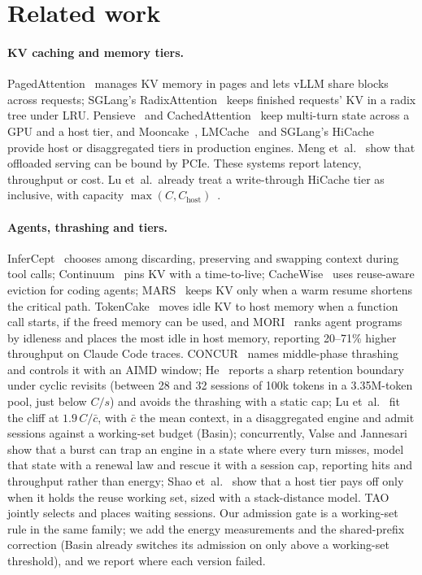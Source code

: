 \section{Related work}
\label{sec:related}

\paragraph{KV caching and memory tiers.} PagedAttention~\cite{kwon2023pagedattention} manages KV memory in pages and
lets vLLM share blocks across requests; SGLang's RadixAttention~\cite{zheng2024sglang} keeps finished requests' KV in a
radix tree under LRU\@. Pensieve~\cite{yu2025pensieve} and CachedAttention~\cite{gao2024cachedattention} keep
multi-turn state across a GPU and a host tier, and Mooncake~\cite{qin2024mooncake}, LMCache~\cite{liu2025lmcache} and
SGLang's HiCache~\cite{xie2025hicache} provide host or disaggregated tiers in production engines. Meng
et~al.~\cite{meng2025bottlenecks} show that offloaded serving can be bound by PCIe. These systems report latency,
throughput or cost. Lu et~al.\ already treat a write-through HiCache tier as inclusive, with capacity
$\max(C, C_{\text{host}})$~\cite{lu2026metastability}.

\paragraph{Agents, thrashing and tiers.} InferCept~\cite{abhyankar2024infercept} chooses among discarding, preserving
and swapping context during tool calls; Continuum~\cite{li2025continuum} pins KV with a time-to-live; CacheWise~\cite{tiwari2026cachewise}
uses reuse-aware eviction for coding agents; MARS~\cite{wang2026mars} keeps KV only when a warm resume shortens the
critical path. TokenCake~\cite{tokencake2025} moves idle KV to host memory when a function call starts, if the freed memory can be used, and
MORI~\cite{xia2026mori} ranks agent programs by idleness and places the most idle in host memory, reporting 20--71\%
higher throughput on Claude Code traces. CONCUR~\cite{chen2026concur} names middle-phase thrashing and controls it with
an AIMD window; He~\cite{he2026robot} reports a sharp retention boundary under cyclic revisits (between 28 and 32 sessions of 100k tokens in a 3.35M-token pool,
just below $C/s$) and avoids the thrashing with a static cap; Lu et~al.~\cite{lu2026metastability} fit the cliff at $1.9\,C/\bar c$, with $\bar c$ the mean context, in a disaggregated engine and admit
sessions against a working-set budget (Basin); concurrently, Valse and Jannesari~\cite{valse2026trap} show that a burst can
trap an engine in a state where every turn misses, model that state with a renewal law and rescue it with a session
cap, reporting hits and throughput rather than energy; Shao et~al.~\cite{shao2026efficientagent} show that a host tier pays
off only when it holds the reuse working set, sized with a stack-distance model. TAO~\cite{li2026tao} jointly selects
and places waiting sessions. Our admission gate is a working-set rule in the same
family; we add the energy measurements and the shared-prefix correction (Basin already switches its admission on only
above a working-set threshold), and we report where each version failed.

